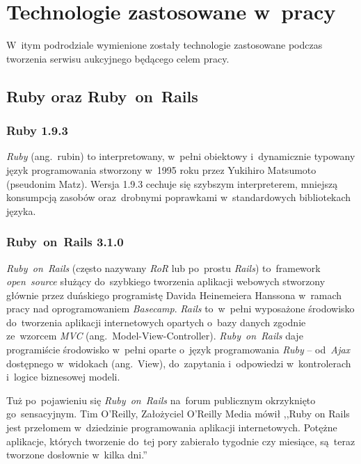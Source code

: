 \section{Technologie zastosowane w~pracy}

W~itym podrodziale wymienione zostały technologie zastosowane podczas tworzenia serwisu aukcyjnego będącego celem pracy.

\subsection{Ruby oraz Ruby~on~Rails} \label{technologie.baza}

\subsubsection{Ruby 1.9.3} \label{technologie.ruby}

\textit{Ruby} (ang.~rubin) to interpretowany, w~pełni obiektowy i~dynamicznie typowany język programowania stworzony w~1995 roku przez Yukihiro Matsumoto (pseudonim Matz). Wersja 1.9.3 cechuje się szybszym interpreterem, mniejszą konsumpcją zasobów oraz~drobnymi poprawkami w~standardowych bibliotekach języka.

\subsubsection{Ruby~on~Rails 3.1.0} \label{technologie.ror}

\textit{Ruby~on~Rails}\cite{ror} (często nazywany \textit{RoR} lub po~prostu \textit{Rails}) to~framework \textit{open~source} służący do~szybkiego tworzenia aplikacji webowych stworzony głównie przez duńskiego programistę Davida Heinemeiera Hanssona w~ramach pracy nad oprogramowaniem \textit{Basecamp}\cite{basecamp}. \textit{Rails} to~w~pełni wyposażone środowisko do~tworzenia aplikacji internetowych opartych o~bazy danych zgodnie ze~wzorcem \textit{MVC} (ang.~Model-View-Controller). \textit{Ruby~on~Rails} daje programiście środowisko w~pełni oparte o~język programowania \textit{Ruby} -- od~\textit{Ajax} dostępnego w~widokach (ang.~View), do~zapytania i~odpowiedzi w~kontrolerach i~logice biznesowej modeli.


Tuż po~pojawieniu się \textit{Ruby~on~Rails} na~forum publicznym okrzyknięto go~sensacyjnym. Tim O'Reilly, Założyciel O'Reilly Media mówił\cite{cytaty} ,,Ruby on Rails jest przełomem w~dziedzinie programowania aplikacji internetowych. Potężne aplikacje, których tworzenie do~tej pory zabierało tygodnie czy miesiące, są~teraz tworzone dosłownie w~kilka dni.''


